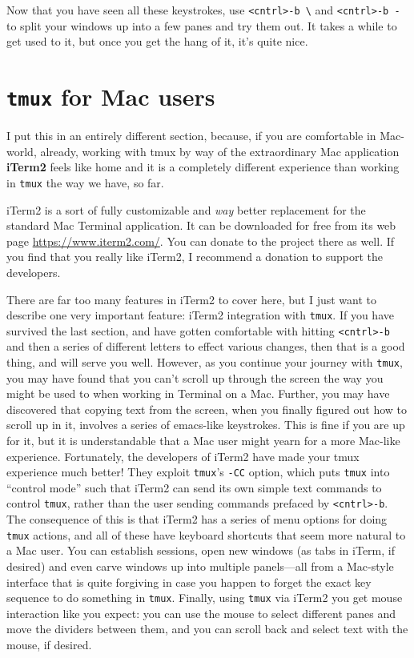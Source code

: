 \documentclass[]{krantz}
\begin{document}
Now that you have seen all these keystrokes, use \texttt{\textless{}cntrl\textgreater{}-b\ \textbackslash{}} and \texttt{\textless{}cntrl\textgreater{}-b\ -} to split your windows
up into a few panes and try them out. It takes a while to get used to it, but once you get
the hang of it, it's quite nice.

\hypertarget{tmux-for-mac-users}{%
\section{\texorpdfstring{\texttt{tmux} for Mac users}{tmux for Mac users}}\label{tmux-for-mac-users}}

I put this in an entirely different section, because, if you are comfortable in
Mac-world, already, working with tmux by way of the extraordinary Mac application
\textbf{iTerm2} feels like home and it is a completely different experience than
working in \texttt{tmux} the way we have, so far.

iTerm2 is a sort of fully customizable and \emph{way} better replacement for the
standard Mac Terminal application. It can be downloaded for free
from its web page \url{https://www.iterm2.com/}. You can
donate to the project there as well. If you find that you really like iTerm2,
I recommend a donation to support the developers.

There are far too many features in iTerm2 to cover here, but I just want to describe
one very important feature: iTerm2 integration with \texttt{tmux}. If you have survived the
last section, and have gotten comfortable with hitting \texttt{\textless{}cntrl\textgreater{}-b} and then a series
of different letters to effect various changes, then that is a good thing, and will
serve you well. However, as you continue your journey with \texttt{tmux}, you may have found that
you can't scroll up through the screen the way you might be used to when working in Terminal
on a Mac. Further, you may have discovered that copying text from the screen, when you
finally figured out how to scroll up in it, involves a series of emacs-like keystrokes.
This is fine if you are up for it, but it is understandable that a Mac user might yearn
for a more Mac-like experience. Fortunately, the developers of iTerm2 have made your tmux experience
much better! They exploit \texttt{tmux}'s \texttt{-CC} option, which puts \texttt{tmux} into ``control mode'' such that
iTerm2 can send its own simple text commands to control \texttt{tmux}, rather than the user sending
commands prefaced by \texttt{\textless{}cntrl\textgreater{}-b}. The consequence of this is that iTerm2 has a series of menu options
for doing \texttt{tmux} actions, and all of these have keyboard shortcuts that seem more natural to
a Mac user. You can establish sessions, open new windows (as tabs in iTerm, if desired) and
even carve windows up into multiple panels---all from a Mac-style interface that is quite forgiving
in case you happen to forget the exact key sequence to do something in \texttt{tmux}.
Finally, using \texttt{tmux} via iTerm2 you get mouse interaction like you expect: you can use the
mouse to select different panes and move the dividers between them, and you can scroll back
and select text with the mouse, if desired.
\end{document}
